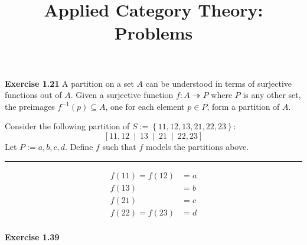 \documentclass{amsart}
\title{Applied Category Theory: Problems}
\newcommand{\surj}{\twoheadrightarrow}
\newcommand{\inv}{^{-1}}
\newcommand{\Break}{\vspace{0.2cm}\hrule{}\vspace{0.2cm}}
\begin{document}
 \maketitle

\noindent\textbf{Exercise 1.21} A partition on a set $A$ can be understood in
terms of surjective functions out of $A$. Given a surjective function $f:
A \surj P$ where $P$ is any other set, the preimages $f\inv(p) \subseteq A$,
one for each element $p \in P$, form a partition of $A$.

Consider the following partition of $S := \left\{ 11, 12, 13, 21, 22, 23
\right\}$:
\[
  \left[ 11, 12 ~\middle|~ 13 ~\middle|~ 21 ~\middle|~ 22, 23 \right]
\]
Let $P := {a, b, c, d}$. Define $f$ such that $f$ models the partitions
above.

\Break{}

\begin{align*}
  f(11) = f(12) &= a \\
          f(13) &= b \\
          f(21) &= c \\
  f(22) = f(23) &= d \\
\end{align*}

\newpage{}

\noindent\textbf{Exercise 1.39} 
\end{document}
